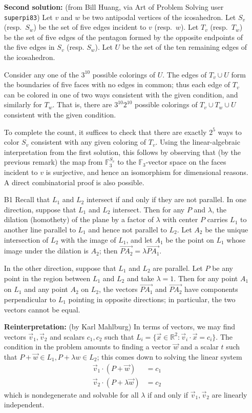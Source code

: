 \documentclass[amssymb,twocolumn,pra,10pt,aps]{revtex4-1}
\begin{document}
\begin{itemize}
\noindent
\textbf{Second solution:}
(from Bill Huang, via Art of Problem Solving user \texttt{superpi83})
Let $v$ and $w$ be two antipodal vertices of the icosahedron. Let $S_v$ (resp.\ $S_w$) be the set of five edges incident to $v$ (resp.\ $w$). Let $T_v$ (resp.\ $T_w$) be the set of five edges of the pentagon formed by the opposite endpoints of the five edges in $S_v$ (resp. $S_w$). Let $U$ be the set of the ten remaining edges of the icosahedron.

Consider any one of the $3^{10}$ possible colorings of $U$. The edges of $T_v \cup U$ form the boundaries of five faces with no edges in common; thus each edge of $T_v$ can be colored in one of two ways consistent with the given condition,
and similarly for $T_w$. That is, there are $3^{10} 2^{10}$ possible colorings of $T_v \cup T_w \cup U$ consistent with the given condition.

To complete the count, it suffices to check that there are exactly $2^5$ ways to color $S_v$ consistent with any given coloring of $T_v$. Using the linear-algebraic interpretation from the first solution, this follows by observing that
(by the previous remark) the map from $\mathbb{F}_3^{S_v}$ to the $\mathbb{F}_3$-vector space on the faces incident to $v$ is surjective, and hence an isomorphism for dimensional reasons. A direct combinatorial proof is also possible.

\item[B1]
Recall that $L_1$ and $L_2$ intersect if and only if they are not parallel. 
In one direction, suppose that $L_1$ and $L_2$ intersect. Then for any $P$ and $\lambda$, the dilation (homothety) of the plane by a factor of $\lambda$ with center $P$ carries $L_1$ to another line parallel to $L_1$ and hence not parallel to $L_2$. Let $A_2$ be the unique intersection of $L_2$ with the image of $L_1$, and let $A_1$ be the point on $L_1$ whose image under the dilation is $A_2$; then $\overrightarrow{PA_2} = \lambda \overrightarrow{PA_1}$.

In the other direction, suppose that $L_1$ and $L_2$ are parallel. Let $P$ be any point in the region between $L_1$ and $L_2$ and take $\lambda = 1$. Then for any point $A_1$ on $L_1$ and any point $A_2$ on $L_2$, the vectors 
$\overrightarrow{PA_1}$ and $\overrightarrow{PA_2}$ have components perpendicular to $L_1$ pointing in opposite directions; in particular, the two vectors cannot be equal.

\noindent
\textbf{Reinterpretation:}
(by Karl Mahlburg)
In terms of vectors, we may find vectors $\vec{v}_1, \vec{v}_2$ and scalars $c_1, c_2$ such that
$L_i = \{\vec{x} \in \mathbb{R}^2: \vec{v}_i \cdot \vec{x} = c_i\}$.
The condition in the problem amounts to finding a vector $\vec{w}$ and a scalar $t$ such that
$P + \vec{w} \in L_1, P + \lambda w \in L_2$; this comes down to solving the linear system
\begin{align*}
\vec{v}_1 \cdot (P + \vec{w}) &= c_1 \\
\vec{v}_2 \cdot (P + \lambda \vec{w}) &= c_2
\end{align*}
which is nondegenerate and solvable for all $\lambda$ if and only if $\vec{v}_1, \vec{v}_2$ are linearly independent.


\end{itemize}
\end{document}
